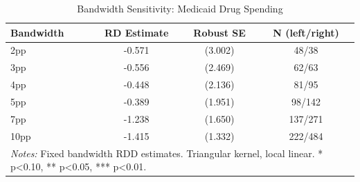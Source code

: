 \begin{table}[!h]
\centering
\caption{\label{tab:tab:bandwidth}Bandwidth Sensitivity: Medicaid Drug Spending}
\centering
\begin{tabular}[t]{lccc}
\toprule
Bandwidth & RD Estimate & Robust SE & N (left/right)\\
\midrule
2pp & -0.571 & (3.002) & 48/38\\
3pp & -0.556 & (2.469) & 62/63\\
4pp & -0.448 & (2.136) & 81/95\\
5pp & -0.389 & (1.951) & 98/142\\
7pp & -1.238 & (1.650) & 137/271\\
\addlinespace
10pp & -1.415 & (1.332) & 222/484\\
\bottomrule
\multicolumn{4}{l}{\rule{0pt}{1em}\textit{Notes:} Fixed bandwidth RDD estimates. Triangular kernel, local linear. * p<0.10, ** p<0.05, *** p<0.01.}\\
\end{tabular}
\end{table}
